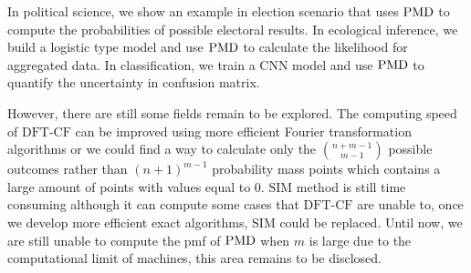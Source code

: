 \documentclass[12pt]{article}
\newcommand{\PMD}{{\normalfont\textrm{PMD}}}
\newcommand{\SIM}{{\textrm{SIM}}}
\newcommand{\dft}{{\textrm{DFT-CF}}}
\begin{document}
In political science, we show an example in election scenario that uses $\PMD$ to compute the probabilities of possible electoral results. In ecological inference, we build a logistic type model and use $\PMD$ to calculate the likelihood for aggregated data. In classification, we train a CNN model and use $\PMD$ to quantify the uncertainty in confusion matrix.



However, there are still some fields remain to be explored. The computing speed of $\dft$ can be improved using more efficient Fourier transformation algorithms or we could find a way to calculate only the $\binom{n+m-1}{m-1}$ possible outcomes rather than $(n+1)^{m-1}$ probability mass points which contains a large amount of points with values equal to 0. $\SIM$ method is still time consuming although it can compute some cases that $\dft$ are unable to, once we develop more efficient exact algorithms, $\SIM$ could be replaced. Until now, we are still unable to compute the pmf of $\PMD$ when $m$ is large due to the computational limit of machines, this area remains to be disclosed.



%



%	
	
\end{document}
